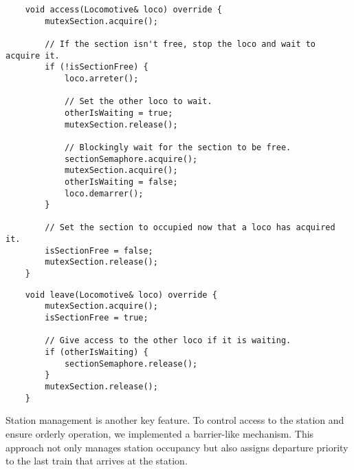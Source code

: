 \documentclass{article}
\begin{document}
    \begin{lstlisting}
    void access(Locomotive& loco) override {
        mutexSection.acquire();

        // If the section isn't free, stop the loco and wait to acquire it.
        if (!isSectionFree) {
            loco.arreter();

            // Set the other loco to wait.
            otherIsWaiting = true;
            mutexSection.release();

            // Blockingly wait for the section to be free.
            sectionSemaphore.acquire();
            mutexSection.acquire();
            otherIsWaiting = false;
            loco.demarrer();
        }

        // Set the section to occupied now that a loco has acquired it.
        isSectionFree = false;
        mutexSection.release();
    }
    \end{lstlisting}

    \begin{lstlisting}
    void leave(Locomotive& loco) override {
        mutexSection.acquire();
        isSectionFree = true;

        // Give access to the other loco if it is waiting.
        if (otherIsWaiting) {
            sectionSemaphore.release();
        }
        mutexSection.release();
    }
    \end{lstlisting}

    \newpage

    Station management is another key feature. To control access to the station and ensure orderly operation, we implemented a barrier-like mechanism. This approach not only manages station occupancy but also assigns departure priority to the last train that arrives at the station.
\end{document}
